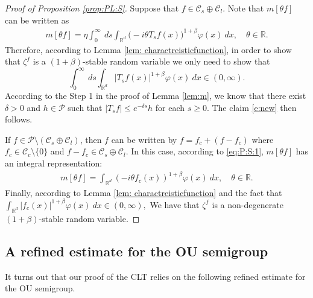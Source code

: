 \documentclass[12pt,a4paper]{amsart}
\theoremstyle{plain}
\theoremstyle{definition}
\numberwithin{equation}{section}
\begin{document}
\begin{proof}[Proof of Proposition \ref{prop:PL:S}]
	Suppose that $f\in \mathcal C_s \oplus \mathcal C_l$.
Note that $m[\theta f]$ can be written as
  \begin{align}
    \label{eq:PL:S:1}
    m[\theta f]
    = \eta \int_0^{\infty}~ds\int_{\mathbb R^d} \big(-i\theta T_s f(x)\big)^{1+\beta} \varphi(x)~dx,
    \quad \theta \in \mathbb R.
  \end{align}
	Therefore, according to Lemma \ref{lem: charactreisticfunction}, in order to show that $\zeta^f$ is a $(1+\beta)$-stable random variable we only need to show that
\begin{equation}\label{e:new}
    \int_0^{\infty}~ds\int_{\mathbb R^d} | T_{s} f(x)|^{1+\beta} \varphi(x)~dx
    \in (0, \infty).
\end{equation}
  According to the Step 1 in the proof of Lemma \ref{lem:m}, we know that there exist $\delta> 0$ and $h \in \mathcal P$ such that $|T_sf| \leq e^{- \delta s} h$ for each $s\geq 0$.
The claim \eqref{e:new} then follows.

  If $f \in \mathcal P \setminus (\mathcal C_s \oplus \mathcal C_l)$, then $f$ can be written by $f = f_c +(f - f_c)$ where $f_c \in \mathcal C_c\setminus\{0\}$ and $f - f_c \in \mathcal C_s \oplus \mathcal C_l$.
  In this case, according to \eqref{eq:P:S:1}, $m[\theta f]$ has an integral representation:
  \begin{align}
    \label{eq:PL:S:2}
    m[\theta f]
    = \int_{\mathbb R^d} (-i\theta f_c(x))^{1+\beta} \varphi(x) ~dx,
    \quad \theta \in \mathbb R.
  \end{align}
  Finally, according to Lemma \ref{lem: charactreisticfunction} and the fact that
 $
    \int_{\mathbb R^d} | f_c(x)|^{1+\beta} \varphi(x)~dx
    \in (0, \infty),
  $
  We have that $\zeta^f$ is a non-degenerate $(1+\beta)$-stable random variable.
\end{proof}

\subsection{A refined estimate for the OU semigroup}\label{sc:refined}
It turns out that our proof of the CLT relies on the following refined estimate for the OU semigroup.
\end{document}
